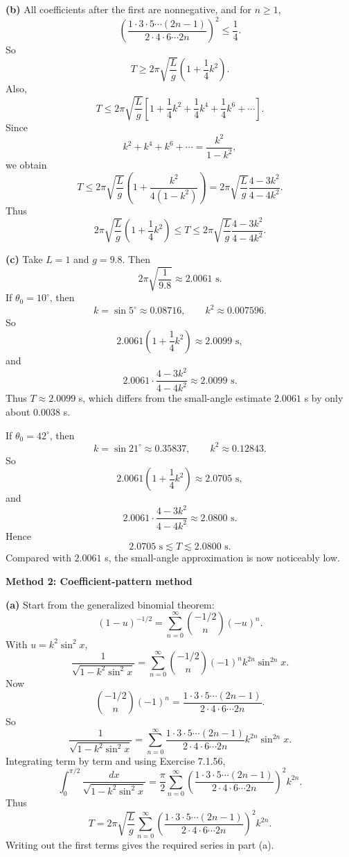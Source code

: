 \documentclass[a4paper,12pt,twocolumn]{article}
\newenvironment{solutionbox}{\begin{framed}}{\end{framed}}
\begin{document}
\begin{enumerate}[label=\textbf{\arabic*.}, leftmargin=2em, itemsep=1.2em]
\begin{solutionbox}
\textbf{(b)} All coefficients after the first are nonnegative, and for \(n\ge 1\),
\[
\left(
\frac{1\cdot 3\cdot 5\cdots (2n-1)}{2\cdot 4\cdot 6\cdots 2n}
\right)^2
\le \frac14.
\]
So
\[
T\ge 2\pi\sqrt{\frac{L}{g}}\left(1+\frac14k^2\right).
\]
Also,
\[
T\le
2\pi\sqrt{\frac{L}{g}}
\left[
1+\frac14k^2+\frac14k^4+\frac14k^6+\cdots
\right].
\]
Since
\[
k^2+k^4+k^6+\cdots=\frac{k^2}{1-k^2},
\]
we obtain
\[
T\le
2\pi\sqrt{\frac{L}{g}}
\left(1+\frac{k^2}{4(1-k^2)}\right)
=
2\pi\sqrt{\frac{L}{g}}\frac{4-3k^2}{4-4k^2}.
\]
Thus
\[
\boxed{
2\pi\sqrt{\frac{L}{g}}\left(1+\frac14k^2\right)
\le T\le
2\pi\sqrt{\frac{L}{g}}\frac{4-3k^2}{4-4k^2}.
}
\]

\textbf{(c)} Take \(L=1\) and \(g=9.8\). Then
\[
2\pi\sqrt{\frac{1}{9.8}}\approx 2.0061\text{ s}.
\]
If \(\theta_0=10^\circ\), then
\[
k=\sin 5^\circ\approx 0.08716,\qquad k^2\approx 0.007596.
\]
So
\[
2.0061\left(1+\frac14k^2\right)\approx 2.0099\text{ s},
\]
and
\[
2.0061\cdot \frac{4-3k^2}{4-4k^2}\approx 2.0099\text{ s}.
\]
Thus \(T\approx 2.0099\) s, which differs from the small-angle estimate \(2.0061\) s by only about \(0.0038\) s.

If \(\theta_0=42^\circ\), then
\[
k=\sin 21^\circ\approx 0.35837,\qquad k^2\approx 0.12843.
\]
So
\[
2.0061\left(1+\frac14k^2\right)\approx 2.0705\text{ s},
\]
and
\[
2.0061\cdot \frac{4-3k^2}{4-4k^2}\approx 2.0800\text{ s}.
\]
Hence
\[
\boxed{2.0705\text{ s}\lesssim T\lesssim 2.0800\text{ s}.}
\]
Compared with \(2.0061\) s, the small-angle approximation is now noticeably low.
\end{solutionbox}

\begin{solutionbox}
\textbf{Method 2: Coefficient-pattern method}

\textbf{(a)} Start from the generalized binomial theorem:
\[
(1-u)^{-1/2}
=
\sum_{n=0}^{\infty}\binom{-1/2}{n}(-u)^n.
\]
With \(u=k^2\sin^2x\),
\[
\frac{1}{\sqrt{1-k^2\sin^2x}}
=
\sum_{n=0}^{\infty}\binom{-1/2}{n}(-1)^n k^{2n}\sin^{2n}x.
\]
Now
\[
\binom{-1/2}{n}(-1)^n
=
\frac{1\cdot 3\cdot 5\cdots(2n-1)}{2\cdot 4\cdot 6\cdots 2n}.
\]
So
\[
\frac{1}{\sqrt{1-k^2\sin^2x}}
=
\sum_{n=0}^{\infty}
\frac{1\cdot 3\cdot 5\cdots(2n-1)}{2\cdot 4\cdot 6\cdots 2n}
k^{2n}\sin^{2n}x.
\]
Integrating term by term and using Exercise 7.1.56,
\[
\int_0^{\pi/2}\frac{dx}{\sqrt{1-k^2\sin^2x}}
=
\frac{\pi}{2}\sum_{n=0}^{\infty}
\left(
\frac{1\cdot 3\cdot 5\cdots(2n-1)}{2\cdot 4\cdot 6\cdots 2n}
\right)^2
k^{2n}.
\]
Thus
\[
\boxed{
T=
2\pi\sqrt{\frac{L}{g}}
\sum_{n=0}^{\infty}
\left(
\frac{1\cdot 3\cdot 5\cdots(2n-1)}{2\cdot 4\cdot 6\cdots 2n}
\right)^2
k^{2n}.
}
\]
Writing out the first terms gives the required series in part (a).


\end{solutionbox}
\end{enumerate}
\end{document}
